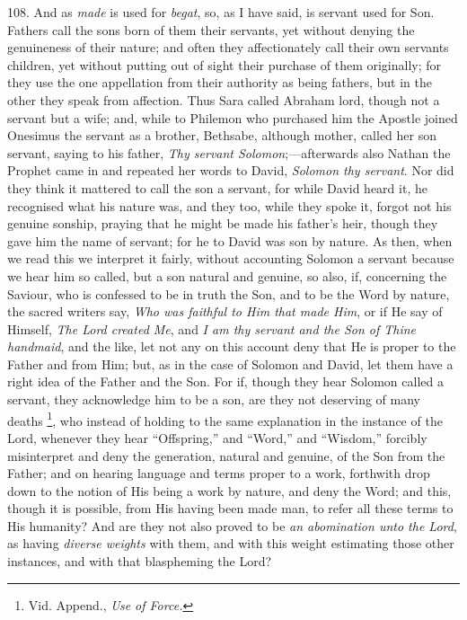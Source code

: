 108. And as \emph{made} is
used for \emph{begat}, so, as I have said, is servant used for Son.
Fathers call the sons born of them their servants, yet without denying
the genuineness of their nature; and often they affectionately call
their own servants children, yet without putting out of sight their
purchase of them originally; for they use the one appellation from
their authority as being fathers, but in the other they speak from
affection. Thus Sara called Abraham lord, though not a servant but a
wife; and, while to Philemon who purchased him the Apostle joined
Onesimus the servant as a brother, Bethsabe, although mother, called
her son servant, saying to his father, \emph{Thy servant Solomon};—afterwards
also Nathan the Prophet came in and repeated her words to David, \emph{Solomon
thy servant}. Nor did they think it mattered to call the son
a servant, for while David heard it, he recognised what his nature
was, and they too, while they spoke it, forgot not his genuine sonship,
praying that he might be made his father's heir, though they gave him
the name of servant; for he to David was son by nature. As then, when
we read this we interpret it fairly, without accounting Solomon a
servant because we hear him so called, but a son natural and genuine,
so also, if, concerning the Saviour, who is confessed to be in truth
the Son, and to be the Word by nature, the sacred writers say, \emph{Who
was faithful to Him that made Him}, or if He say of Himself, \emph{The
Lord created Me}, and \emph{I am thy servant and the Son of Thine
handmaid}, and the like, let not any on this account deny that He
is proper to the Father and from Him; but, as in the case of Solomon
and David, let them have a right idea of the Father and the Son. For
if, though they hear Solomon called a servant, they acknowledge him to
be a son, are they not deserving of many deaths \footnote{Vid. Append., \emph{Use of Force.}}, who instead of holding to the same explanation in the instance
of the Lord, whenever they hear ``Offspring,'' and ``Word,'' and ``Wisdom,''
forcibly misinterpret and deny the generation, natural and genuine, of
the Son from the Father; and on hearing language and terms proper to a
work, forthwith drop down to the notion of His being a work by nature,
and deny the Word; and this, though it is possible, from His having
been made man, to refer all these terms to His humanity? And are they
not also proved to be \emph{an abomination unto the Lord}, as having \emph{diverse
weights} with them, and with this weight estimating those other
instances, and with that blaspheming the Lord?

